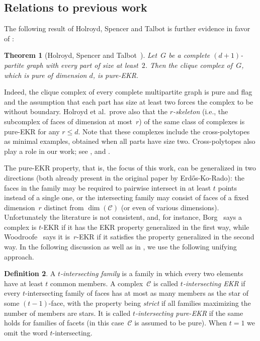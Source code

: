 \documentclass[a4paper,12pt]{amsart}
\theoremstyle{plain}
\newtheorem{theorem}{Theorem}[section]
\theoremstyle{definition}
\newtheorem{definition}[theorem]{Definition}
\newcommand{\darkred}{\color{darkred}} %
\newcommand{\C}{\mathcal C}
\newcommand{\defn}[1]{\emph{\darkred #1}} %
\begin{document}
\subsection{Relations to previous work}
\label{ssec:relations}

The following result of  Holroyd, Spencer and Talbot is further evidence in favor of :

\begin{theorem}[Holroyd, Spencer and Talbot~\cite{HST2005}]
\label{thm:HST05}
  Let~$G$ be a complete $(d+1)$-partite graph with every part of size at least~$2$.
  Then the clique complex of~$G$, which is pure of dimension $d$, is pure-EKR.
\end{theorem}

Indeed, the clique complex of every complete multipartite graph is pure and flag and the assumption that each part has size at least two forces the complex to be without boundary.
Holroyd et al.~prove also that the \defn{$r$-skeleton} (i.e., the subcomplex of faces of dimension at most~$r$) of the same class of complexes is pure-EKR for any $r \leq d$.
Note that these complexes include the cross-polytopes as minimal examples, obtained when all parts have size two. Cross-polytopes also play a role in our work; see ,  and .


\medskip

The pure-EKR property, that is, the focus of this work, can be generalized in two directions (both already present in the original paper by Erd\H{o}s-Ko-Rado): the faces in the family may be required to pairwise intersect in at least $t$ points instead of a single one, or the intersecting family may consist of faces of a fixed dimension~$r$ distinct from $\dim(\C)$ (or even of various dimensions). Unfortunately the literature is not consistent, and, for instance, Borg~\cite{Bor2009} says a complex is $t$-EKR if it has the EKR property generalized in the first way, while Woodroofe~\cite{Woodroofe2011} says it is~$r$-EKR if it satisfies the property generalized in the second way. In the following discussion as well as in , we use the following unifying approach.

\begin{definition}
\label{EKR-general}
A \defn{$t$-intersecting family} is a family in which every two elements have at least $t$ common members.
A complex~$\C$ is called \defn{$t$-intersecting EKR} if every $t$-intersecting family of faces has at most as many members as the star of some $(t-1)$-face, with the property being \defn{strict} if all families maximizing the number of members are stars. It is called \defn{$t$-intersecting pure-EKR} if the same holds for families of facets (in this case~$\C$ is assumed to be pure). When $t=1$ we omit the word $t$-intersecting.
\end{definition}
\end{document}

